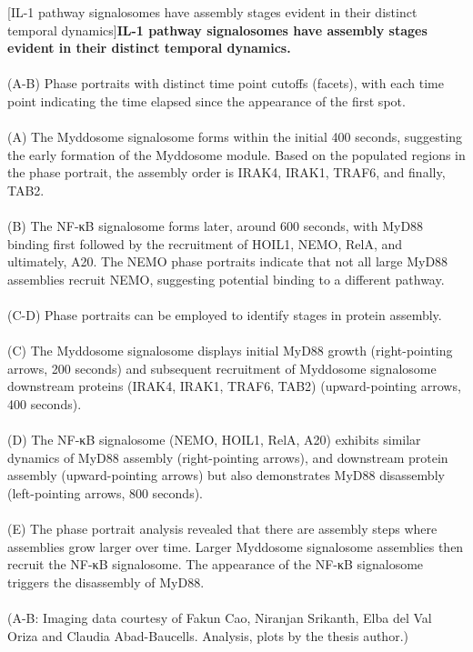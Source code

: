\begin{centering}
\captionsetup{parbox=none}
[IL-1 pathway signalosomes have assembly stages evident in their distinct temporal dynamics]{\textbf{IL-1 pathway signalosomes have assembly stages evident in their distinct temporal dynamics.}
\\
\\
(A-B) Phase portraits with distinct time point cutoffs (facets), with each time point indicating the time elapsed since the appearance of the first spot.
\\
\\
(A) The Myddosome signalosome forms within the initial 400 seconds, suggesting the early formation of the Myddosome module. Based on the populated regions in the phase portrait, the assembly order is IRAK4, IRAK1, TRAF6, and finally, TAB2.
\\
\\
(B) The NF-κB signalosome forms later, around 600 seconds, with MyD88 binding first followed by the recruitment of HOIL1, NEMO, RelA, and ultimately, A20. The NEMO phase portraits indicate that not all large MyD88 assemblies recruit NEMO, suggesting potential binding to a different pathway.
\\
\\
(C-D) Phase portraits can be employed to identify stages in protein assembly.
\\
\\
(C) The Myddosome signalosome displays initial MyD88 growth (right-pointing arrows, 200 seconds) and subsequent recruitment of Myddosome signalosome downstream proteins (IRAK4, IRAK1, TRAF6, TAB2) (upward-pointing arrows, 400 seconds).
\\
\\
(D) The NF-κB signalosome (NEMO, HOIL1, RelA, A20) exhibits similar dynamics of MyD88 assembly (right-pointing arrows), and downstream protein assembly (upward-pointing arrows) but also demonstrates MyD88 disassembly (left-pointing arrows, 800 seconds).
\\
\\
(E) The phase portrait analysis revealed that there are assembly steps where assemblies grow larger over time. Larger Myddosome signalosome assemblies then recruit the NF-κB signalosome. The appearance of the NF-κB signalosome triggers the disassembly of MyD88.
\\
\\
(A-B: Imaging data courtesy of Fakun Cao, Niranjan Srikanth, Elba del Val Oriza and Claudia Abad-Baucells. Analysis, plots by the thesis author.)}
\label{p2:S4}
\end{centering}

